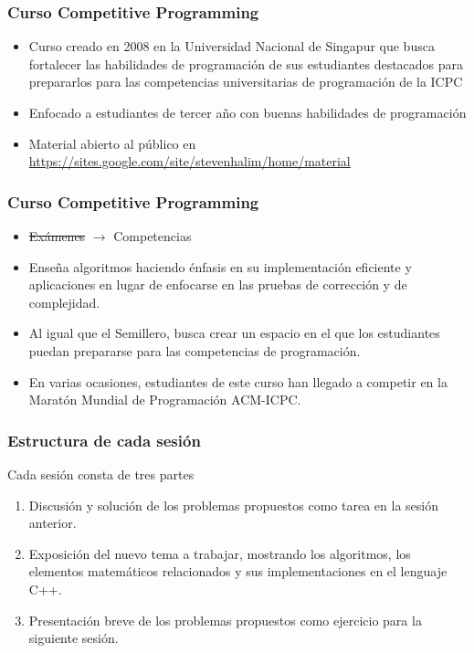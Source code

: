 \documentclass{beamer}
\begin{document}
	\begin{frame}
		\frametitle{Curso Competitive Programming}
		\begin{itemize}
			\item{Curso creado en 2008 en la Universidad Nacional de Singapur que busca fortalecer las habilidades de programación de sus estudiantes destacados para prepararlos para las competencias universitarias de programación de la ICPC}
			\item{Enfocado a estudiantes de tercer año con buenas habilidades de programación}
			\item{Material abierto al público en \url{https://sites.google.com/site/stevenhalim/home/material}}
		\end{itemize}
	\end{frame}
	
	\begin{frame}
		\frametitle{Curso Competitive Programming}
		\begin{itemize}
			\item \sout{Exámenes} $\rightarrow$ Competencias %
			\item Enseña algoritmos haciendo énfasis en su implementación eficiente y aplicaciones en lugar de enfocarse en las pruebas de corrección y de complejidad.
			\item Al igual que el Semillero, busca crear un espacio en el que los estudiantes puedan prepararse para las competencias de programación.
			\item En varias ocasiones, estudiantes de este curso han llegado a competir en la Maratón Mundial de Programación ACM-ICPC.
		\end{itemize}
	\end{frame}
	
	\begin{frame}
		\frametitle{Estructura de cada sesión}
		Cada sesión consta de tres partes
		\begin{enumerate}
			\item{Discusión y solución de los problemas propuestos como tarea en la sesión anterior.}
			\item{Exposición del nuevo tema a trabajar, mostrando los algoritmos, los elementos matemáticos relacionados y sus implementaciones en el lenguaje C++.}
			\item{Presentación breve de los problemas propuestos como ejercicio para la siguiente sesión.}
		\end{enumerate}
	\end{frame}
	
\end{document}
